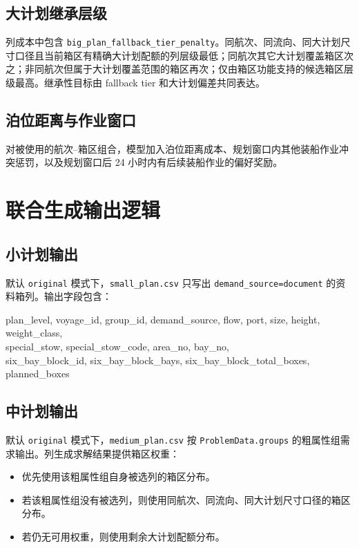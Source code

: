 \documentclass[UTF8,a4paper,11pt]{ctexart}
\newcommand{\code}[1]{\nolinkurl{#1}}
\begin{document}
\subsection{大计划继承层级}

列成本中包含 \code{big_plan_fallback_tier_penalty}。同航次、同流向、同大计划尺寸口径且当前箱区有精确大计划配额的列层级最低；同航次其它大计划覆盖箱区次之；非同航次但属于大计划覆盖范围的箱区再次；仅由箱区功能支持的候选箱区层级最高。继承性目标由 fallback tier 和大计划偏差共同表达。

\subsection{泊位距离与作业窗口}

对被使用的航次--箱区组合，模型加入泊位距离成本、规划窗口内其他装船作业冲突惩罚，以及规划窗口后 24 小时内有后续装船作业的偏好奖励。

\section{联合生成输出逻辑}

\subsection{小计划输出}

默认 \code{original} 模式下，\code{small_plan.csv} 只写出 \code{demand_source=document} 的资料箱列。输出字段包含：
\begin{flushleft}\small\ttfamily
plan\_level, voyage\_id, group\_id, demand\_source, flow, port, size, height, weight\_class,\\
special\_stow, special\_stow\_code, area\_no, bay\_no,\\
six\_bay\_block\_id, six\_bay\_block\_bays, six\_bay\_block\_total\_boxes, planned\_boxes
\end{flushleft}

\subsection{中计划输出}

默认 \code{original} 模式下，\code{medium_plan.csv} 按 \code{ProblemData.groups} 的粗属性组需求输出。列生成求解结果提供箱区权重：
\begin{itemize}
  \item 优先使用该粗属性组自身被选列的箱区分布。
  \item 若该粗属性组没有被选列，则使用同航次、同流向、同大计划尺寸口径的箱区分布。
  \item 若仍无可用权重，则使用剩余大计划配额分布。
\end{itemize}
\end{document}
